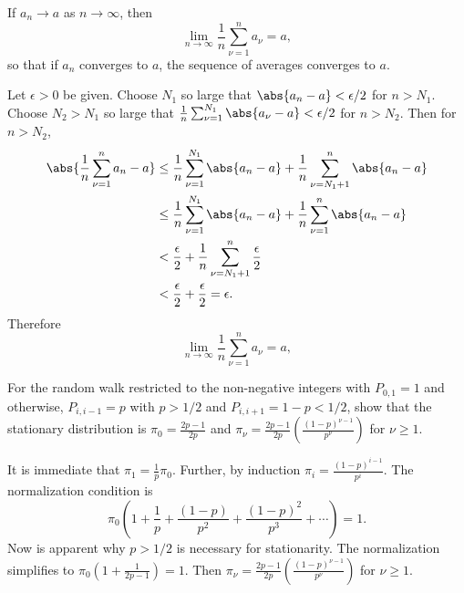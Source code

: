 \documentclass[12pt]{article}
\begin{document}
\begin{exercise}
    If \( a_n \to a \) as \( n \to \infty \), then
    \[
        \lim_{n \to \infty} \frac{1}{n} \sum\limits_{\nu=1}^{n} a_\nu =
        a,
    \] so that if \( a_n \) converges to \( a \), the sequence of
    averages converges to \( a \).
\end{exercise}
\begin{solution}
    Let \( \epsilon > 0 \) be given.  Choose \( N_1 \) so large that \(
    \abs{a_n - a} < \epsilon/2 \) for \( n > N_1 \).  Choose \( N_2 > N_1
    \) so large that \( \frac{1}{n} \sum_{\nu=1}^{N_1} \abs{a_{\nu} - a}
    < \epsilon/2 \) for \( n > N_2 \).  Then for \( n > N_2 \),
    \begin{align*}
        \abs{\frac{1}{n} \sum\limits_{\nu=1}^{n} a_n - a} &\le \frac{1}{n}
        \sum\limits_{\nu=1}^{N_1} \abs{a_n - a} + \frac{1}{n} \sum\limits_
        {\nu=N_1+1}^{n} \abs{a_n - a} \\
        &\le \frac{1}{n} \sum\limits_{\nu=1}^{N_1} \abs{a_n - a} + \frac
        {1}{n} \sum\limits_{\nu=1}^{n} \abs{a_n - a} \\
        &< \frac{\epsilon}{2} + \frac{1}{n} \sum\limits_{\nu=N_1+1}^{n}
        \frac{\epsilon}{2} \\
        &< \frac{\epsilon}{2} + \frac{\epsilon}{2} = \epsilon.
    \end{align*}
    Therefore
    \[
        \lim_{n \to \infty} \frac{1}{n} \sum\limits_{\nu=1}^{n} a_{\nu}
        = a,
    \]
\end{solution}

\begin{exercise}
    For the random walk restricted to the non-negative integers with \(
    P_{0,1} = 1 \) and otherwise, \( P_{i,i-1} = p \) with \( p > 1/2 \)
    and \( P_{i,i+1} = 1- p < 1/2 \), show that the stationary
    distribution is \( \pi_0 = \frac{2p-1}{2p} \) and \( \pi_{\nu} =
    \frac{2p-1}{2p} \left( \frac{(1-p)^{\nu - 1}}{p^{\nu}} \right) \)
    for \( \nu \ge 1 \).
\end{exercise}
\begin{solution}
    It is immediate that \( \pi_1 = \frac{1}{p} \pi_0 \).  Further, by
    induction \( \pi_i = \frac{(1-p)^{i-1}}{p^i} \).  The normalization
    condition is
    \[
        \pi_0 \left( 1 + \frac{1}{p} + \frac{(1-p)}{p^2} + \frac{(1-p)^{2}}
        {p^3} + \cdots \right) = 1.
    \] Now is apparent why \( p > 1/2 \) is necessary for stationarity.
    The normalization simplifies to \( \pi_0 \left( 1 + \frac{1}{2p-1}
    \right) = 1 \).  Then \( \pi_{\nu} = \frac{2p-1}{2p} \left( \frac{(1-p)^
    {\nu - 1}}{p^{\nu}} \right) \) for \( \nu \ge 1 \).
\end{solution}
\hr
\end{document}

